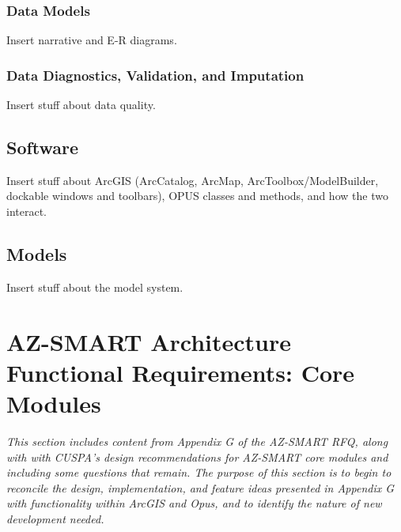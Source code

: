 \documentclass[titlepage]{article}
\begin{document}
\subsubsection{Data Models}
Insert narrative and E-R diagrams.
\subsubsection{Data Diagnostics, Validation, and Imputation}
Insert stuff about data quality.

\subsection{Software}
Insert stuff about ArcGIS (ArcCatalog, ArcMap, ArcToolbox/ModelBuilder, dockable windows and toolbars), OPUS classes and methods, and how the two interact.

\subsection{Models}
Insert stuff about the model system.


\section{AZ-SMART Architecture Functional Requirements: Core Modules}
\emph{This section includes content from Appendix G of the AZ-SMART RFQ, along with with CUSPA's design recommendations for AZ-SMART core modules and including some questions that remain.  The purpose of this section is to begin to reconcile the design, implementation, and feature ideas presented in Appendix G with functionality within ArcGIS and Opus, and to identify the nature of new development needed.}
\end{document}
